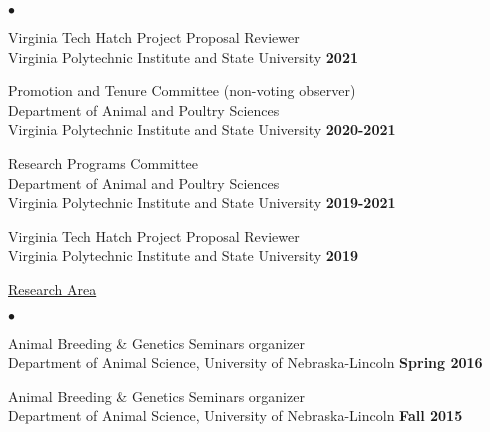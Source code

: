 \documentclass[margin,line,10pt]{res}
\newenvironment{list2}{
  \begin{list}{$\bullet$}{%
      \setlength{\itemsep}{0in}
      \setlength{\parsep}{0in} \setlength{\parskip}{0in}
      \setlength{\topsep}{0in} \setlength{\partopsep}{0in} 
      \setlength{\leftmargin}{0.2in}}}{\end{list}}
\begin{document}
\begin{resume}
\begin{list2}
      \vspace{0.3cm}
  

  \item  Virginia Tech Hatch Project Proposal Reviewer \\
  Virginia Polytechnic Institute and State University \hfill \textbf{2021}  \\

      \vspace{0.3cm}


\item Promotion and Tenure Committee (non-voting observer) \\
  Department of Animal and Poultry Sciences \\ Virginia Polytechnic Institute and State University   \hfill \textbf{2020-2021}\\

    \vspace{0.3cm}

  
\item Research Programs Committee \\
  Department of Animal and Poultry Sciences \\ Virginia Polytechnic Institute and State University  \hfill \textbf{2019-2021}\\

  
  \vspace{0.3cm}

  \item  Virginia Tech Hatch Project Proposal Reviewer \\
  Virginia Polytechnic Institute and State University \hfill \textbf{2019}  \\


\end{list2}


\begin{flushleft}
\hspace{0.3cm} \underline{Research Area}
\end{flushleft}
\begin{list2}
\item Animal Breeding \& Genetics Seminars organizer \\
  Department of Animal Science, University of Nebraska-Lincoln   \hfill \textbf{Spring 2016}\\

\item Animal Breeding \& Genetics Seminars organizer \\
  Department of Animal Science, University of Nebraska-Lincoln   \hfill \textbf{Fall 2015}\\
\end{list2}







\end{resume}
\end{document}
